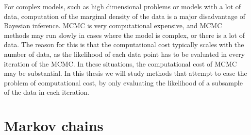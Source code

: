 For complex models, such as high dimensional problems or models with a lot of data, computation of the marginal density of the data is a major disadvantage of Bayesian inference. 
MCMC is very computational expensive, and MCMC methods may run slowly in cases where the model is complex, or there is a lot of data. The reason for this is that the computational cost typically scales with the number of data, as the likelihood of each data point has to be evaluated in every iteration of the MCMC. In these situations, the computational cost of MCMC may be substantial.  In this thesis we will study methods that attempt to ease the problem of computational cost, by only evaluating the likelihood of a subsample of the data in each iteration.   
\section{Markov chains}\label{sec:markov}
